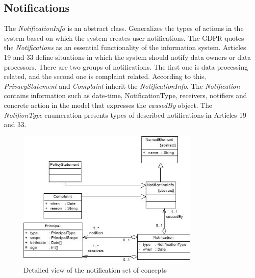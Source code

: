 \documentclass[11pt,english]{article}
\begin{document}
\subsection{Notifications}
The \emph{NotificationInfo} is an abstract class. Generalizes the types of actions in the system based on which the system creates user notifications. The GDPR quotes the \emph{Notifications} as an essential functionality of the information system. Articles 19 and 33 define situations in which the system should notify data owners or data processors. There are two groups of notifications. The first one is data processing related, and the second one is complaint related. According to this, \emph{PrivacyStatement} and \emph{Complaint} inherit the \emph{NotificationInfo}. The \emph{Notification} contains information such as date-time, NotificationType, receivers, notifiers and concrete action in the model that expresses the \emph{causedBy} object. The \emph{NotifionType} enumeration presents types of described notifications in Articles 19 and 33.
\begin{figure}[H]
    \centering
    \includegraphics[width=9cm,scale=0.5]{images/notification.jpg}
    \caption{Detailed view of the notification set of concepts}
    \label{fig:Notifications}
\end{figure}
\end{document}
